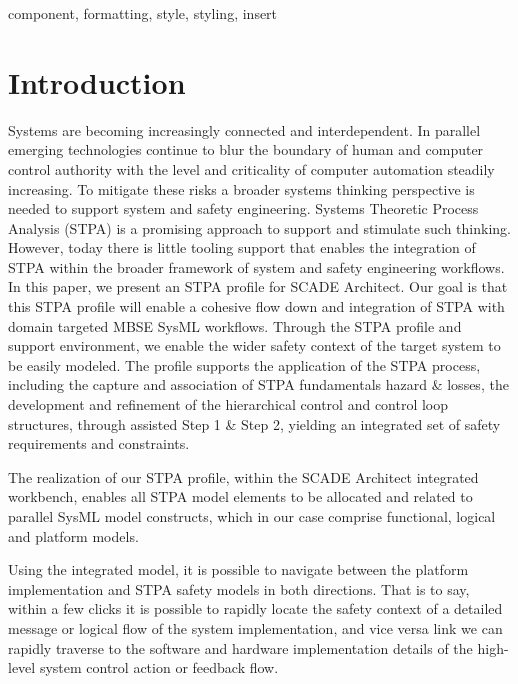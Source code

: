 \documentclass[conference]{IEEEtran}
\begin{document}
\begin{IEEEkeywords}
component, formatting, style, styling, insert
\end{IEEEkeywords}

\section{Introduction}

Systems are becoming increasingly connected and interdependent. In parallel
emerging technologies continue to blur the boundary of human and computer
control authority with the level and criticality of computer automation steadily
increasing. To mitigate these risks a broader systems thinking perspective is
needed to support system and safety engineering. Systems Theoretic Process
Analysis (STPA)\cite{leveson2013stpa,leveson2018stpa} is a promising approach to
support and stimulate such thinking. However, today there is little tooling
support that enables the integration of STPA within the broader framework of
system and safety engineering workflows. In this paper, we present an STPA
profile for SCADE Architect. Our goal is that this STPA profile will enable a
cohesive flow down and integration of STPA with domain targeted MBSE SysML
workflows. Through the STPA profile and support environment, we enable the wider
safety context of the target system to be easily modeled. The profile supports
the application of the STPA process, including the capture and association of
STPA fundamentals hazard \& losses, the development and refinement of the
hierarchical control and control loop structures, through assisted Step 1 \&
Step 2, yielding an integrated set of safety requirements and constraints.

The realization of our STPA profile, within the SCADE Architect integrated
workbench, enables all STPA model elements to be allocated and related to
parallel SysML model constructs, which in our case comprise functional, logical
and platform models.

Using the integrated model, it is possible to navigate between the platform
implementation and STPA safety models in both directions. That is to say, within
a few clicks it is possible to rapidly locate the safety context of a detailed
message or logical flow of the system implementation, and vice versa link we can
rapidly traverse to the software and hardware implementation details of the
high-level system control action or feedback flow.
\end{document}
